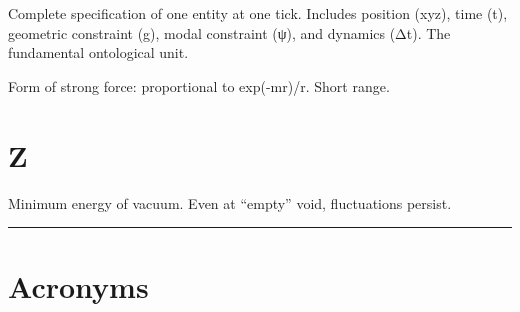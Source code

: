 \documentclass[
  11pt,
  letterpaper,
  twoside,
  openany]{book}
\makeatletter
\providecommand{\tightlist}{%
  \setlength{\itemsep}{0pt}\setlength{\parskip}{0pt}}
\let\orig@section\section
\renewcommand{\section}{\needspace{8\baselineskip}\orig@section}
\makeatother
\begin{document}
\begin{description}
\tightlist
\item[\textbf{xyztgψ(Δt)}]
Complete specification of one entity at one tick. Includes position
(xyz), time (t), geometric constraint (g), modal constraint (ψ), and
dynamics (Δt). The fundamental ontological unit.
\item[\textbf{Yukawa Potential}]
Form of strong force: proportional to exp(-mr)/r. Short range.
\end{description}

\section{Z}\label{z}

\begin{description}
\tightlist
\item[\textbf{Zero-Point Energy}]
Minimum energy of vacuum. Even at ``empty'' void, fluctuations persist.
\end{description}

\begin{center}\rule{0.5\linewidth}{0.5pt}\end{center}

\section{Acronyms}\label{acronyms}
\end{document}
